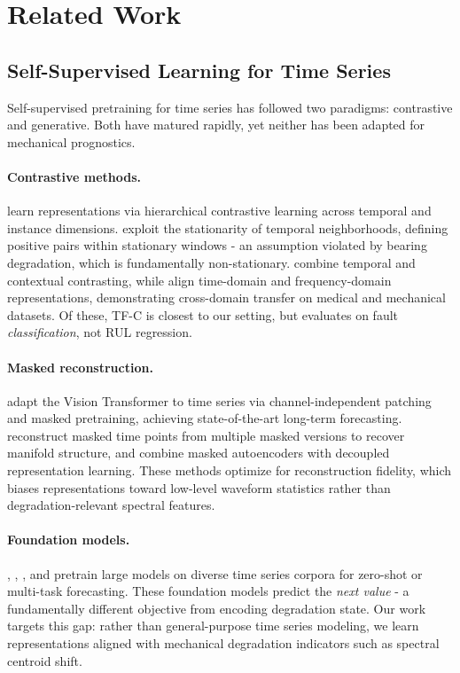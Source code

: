 \section{Related Work}
\label{sec:related}

\subsection{Self-Supervised Learning for Time Series}
\label{sec:related_ssl}

Self-supervised pretraining for time series has followed two paradigms: contrastive and generative. Both have matured rapidly, yet neither has been adapted for mechanical prognostics.

\paragraph{Contrastive methods.} \citet{yue2022ts2vec} learn representations via hierarchical contrastive learning across temporal and instance dimensions. \citet{tonekaboni2021tnc} exploit the stationarity of temporal neighborhoods, defining positive pairs within stationary windows - an assumption violated by bearing degradation, which is fundamentally non-stationary. \citet{eldele2021tstcc} combine temporal and contextual contrasting, while \citet{zhang2022tfc} align time-domain and frequency-domain representations, demonstrating cross-domain transfer on medical and mechanical datasets. Of these, TF-C is closest to our setting, but evaluates on fault \emph{classification}, not RUL regression.

\paragraph{Masked reconstruction.} \citet{nie2023patchtst} adapt the Vision Transformer to time series via channel-independent patching and masked pretraining, achieving state-of-the-art long-term forecasting. \citet{dong2023simmtm} reconstruct masked time points from multiple masked versions to recover manifold structure, and \citet{cheng2023timemae} combine masked autoencoders with decoupled representation learning. These methods optimize for reconstruction fidelity, which biases representations toward low-level waveform statistics rather than degradation-relevant spectral features.

\paragraph{Foundation models.} \citet{das2024timesfm}, \citet{ansari2024chronos}, \citet{goswami2024moment}, and \citet{gao2024units} pretrain large models on diverse time series corpora for zero-shot or multi-task forecasting. These foundation models predict the \emph{next value} - a fundamentally different objective from encoding degradation state. Our work targets this gap: rather than general-purpose time series modeling, we learn representations aligned with mechanical degradation indicators such as spectral centroid shift.

